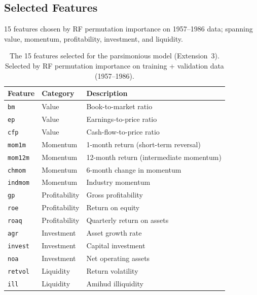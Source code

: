 \documentclass[11pt,a4paper]{article}
\begin{document}
\subsection{Selected Features}

\noindent\small 15 features chosen by RF permutation importance on 1957--1986 data; spanning value, momentum, profitability, investment, and liquidity.

\begin{table}[H]
  \centering
  \small
  \begin{tabular}{lll}
    \toprule
    Feature & Category & Description \\
    \midrule
    \texttt{bm}       & Value         & Book-to-market ratio \\
    \texttt{ep}       & Value         & Earnings-to-price ratio \\
    \texttt{cfp}      & Value         & Cash-flow-to-price ratio \\
    \texttt{mom1m}    & Momentum      & 1-month return (short-term reversal) \\
    \texttt{mom12m}   & Momentum      & 12-month return (intermediate momentum) \\
    \texttt{chmom}    & Momentum      & 6-month change in momentum \\
    \texttt{indmom}   & Momentum      & Industry momentum \\
    \texttt{gp}       & Profitability & Gross profitability \\
    \texttt{roe}      & Profitability & Return on equity \\
    \texttt{roaq}     & Profitability & Quarterly return on assets \\
    \texttt{agr}      & Investment    & Asset growth rate \\
    \texttt{invest}   & Investment    & Capital investment \\
    \texttt{noa}      & Investment    & Net operating assets \\
    \texttt{retvol}   & Liquidity     & Return volatility \\
    \texttt{ill}      & Liquidity     & Amihud illiquidity \\
    \bottomrule
  \end{tabular}
  \caption{The 15 features selected for the parsimonious model (Extension~3). Selected by RF permutation importance on training + validation data (1957--1986).}
  \label{tab:features}
\end{table}
\end{document}
